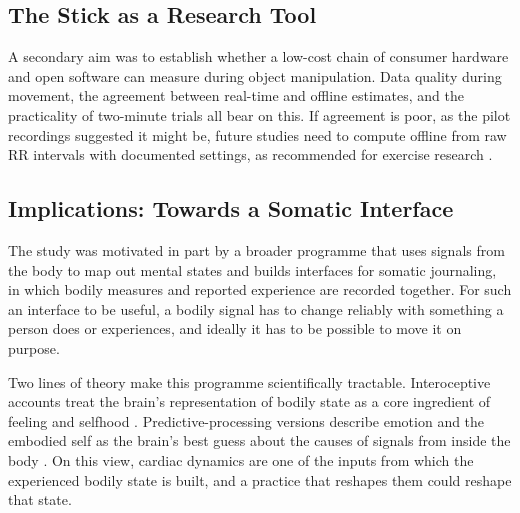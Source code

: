 \subsection{The Stick as a Research Tool}
\label{sec:disc-tool}


A secondary aim was to establish whether a low-cost chain of consumer hardware and open software can measure \al{} during object manipulation. Data quality during movement, the agreement between real-time and offline estimates, and the practicality of two-minute trials all bear on this. If agreement is poor, as the pilot recordings suggested it might be, future studies need to compute \al{} offline from raw RR intervals with documented settings, as recommended for exercise research \citep{hoos2025}.

\subsection{Implications: Towards a Somatic Interface}
\label{sec:disc-somatic}

The study was motivated in part by a broader programme that uses signals from the body to map out mental states and builds interfaces for somatic journaling, in which bodily measures and reported experience are recorded together. For such an interface to be useful, a bodily signal has to change reliably with something a person does or experiences, and ideally it has to be possible to move it on purpose. 


Two lines of theory make this programme scientifically tractable. Interoceptive accounts treat the brain's representation of bodily state as a core ingredient of feeling and selfhood \citep{craig2002}. Predictive-processing versions describe emotion and the embodied self as the brain's best guess about the causes of signals from inside the body \citep{seth2013}. On this view, cardiac dynamics are one of the inputs from which the experienced bodily state is built, and a practice that reshapes them could reshape that state.


